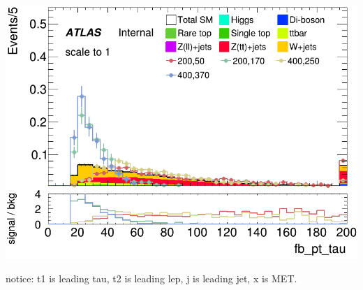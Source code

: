\documentclass[usenames,dvipsnames]{beamer}
\begin{document}
\begin{frame}
\begin{minipage}{0.32\textwidth}
    \end{minipage}
    \hfill
    \begin{minipage}{0.32\textwidth}
        \centering
        \includegraphics[width=\textwidth]{graphics/HH_met_sig/HH_fb_pt_tau_norm.png}
    \end{minipage}
    
    \vspace{0.5cm} %
    
    notice: t1 is leading tau, t2 is leading lep, j is leading jet, x is MET.
\end{frame}
\end{document}

